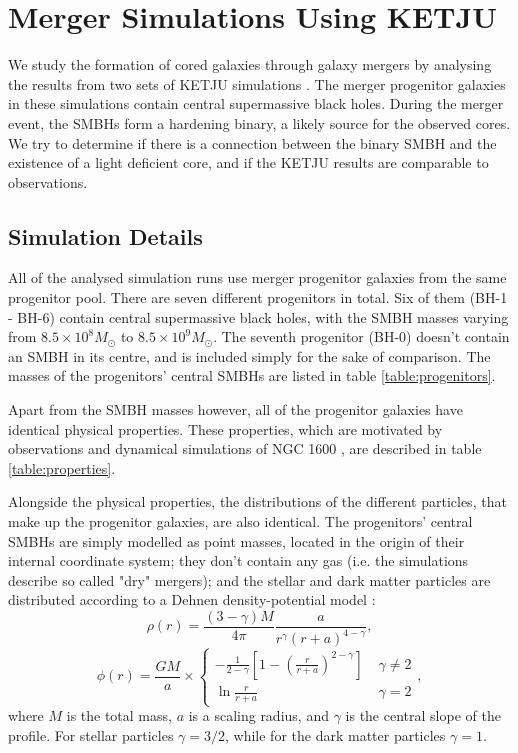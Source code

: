\documentclass[english, oneside]{HYgradu}
\begin{document}
\chapter{Merger Simulations Using KETJU}

We study the formation of cored galaxies through galaxy mergers by analysing the results from two sets of KETJU simulations \citep{Rantala2018, Mannerkoski2019}. The merger progenitor galaxies in these simulations contain central supermassive black holes. During the merger event, the SMBHs form a hardening binary, a likely source for the observed cores. We try to determine if there is a connection between the binary SMBH and the existence of a light deficient core, and if the KETJU results are comparable to observations.


\section{Simulation Details}

All of the analysed simulation runs use merger progenitor galaxies from the same progenitor pool. There are seven different progenitors in total. Six of them (BH-1 - BH-6) contain central supermassive black holes, with the SMBH masses varying from $8.5 \times 10^8 M_\odot$ to $8.5 \times 10^9 M_\odot$. The seventh progenitor (BH-0) doesn't contain an SMBH in its centre, and is included simply for the sake of comparison. The masses of the progenitors' central SMBHs are listed in table \ref{table:progenitors}. 

Apart from the SMBH masses however, all of the progenitor galaxies have identical physical properties. These properties, which are motivated by observations and dynamical simulations of NGC 1600 \citep{Rantala2018}, are described in table \ref{table:properties}.

Alongside the physical properties, the distributions of the different particles, that make up the progenitor galaxies, are also identical. The progenitors' central SMBHs are simply modelled as point masses, located in the origin of their internal coordinate system; they don't contain any gas (i.e. the simulations describe so called "dry" mergers); and the stellar and dark matter particles are distributed according to a Dehnen density-potential model \citep{Dehnen1993}:
\begin{equation}
\rho(r) = \frac{(3-\gamma)M}{4\pi} \frac{a}{r^\gamma (r+a)^{4-\gamma}},
\end{equation}
\begin{equation}
\phi(r) = \frac{GM}{a} \times 
\begin{cases}
	-\frac{1}{2-\gamma} \left[ 1 - \left( \frac{r}{r+a} \right)^{2-\gamma} \right] & \; \gamma \neq 2 \\
	\ln \frac{r}{r+a}	 & \; \gamma = 2
\end{cases},
\end{equation}
where $M$ is the total mass, $a$ is a scaling radius, and $\gamma$ is the central slope of the profile. For stellar particles $\gamma = 3/2$, while for the dark matter particles $\gamma = 1$.
\end{document}
